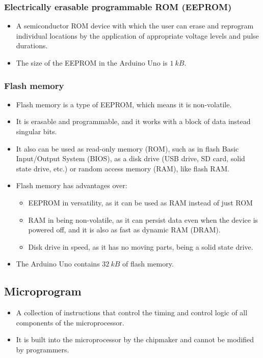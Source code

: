 \documentclass[11pt]{article}
\begin{document}
\subsubsection{Electrically erasable programmable ROM (EEPROM)}
\label{sec:org95e51de}
\begin{itemize}
\item A semiconductor ROM device with which the user can erase and reprogram individual locations by the application of appropriate voltage levels and pulse durations.
\item The size of the EEPROM in the Arduino Uno is \(\qty{1}{kB}\).
\end{itemize}

 \newpage

\subsubsection{Flash memory}
\label{sec:orgfafd8ae}
\begin{itemize}
\item Flash memory is a type of EEPROM, which means it is non-volatile.
\item It is erasable and programmable, and it works with a block of data instead singular bits.
\item It also can be used as read-only memory (ROM), such as in flash Basic Input/Output System (BIOS), as a disk drive (USB drive, SD card, solid state drive, etc.) or random access memory (RAM), like flash RAM.
\item Flash memory has advantages over:
\begin{itemize}
\item EEPROM in versatility, as it can be used as RAM instead of just ROM
\item RAM in being non-volatile, as it can persist data even when the device is powered off, and it is also as fast as dynamic RAM (DRAM).
\item Disk drive in speed, as it has no moving parts, being a solid state drive.
\end{itemize}
\item The Arduino Uno contains \(\qty{32}{kB}\) of flash memory.
\end{itemize}

\subsection{Microprogram}
\label{sec:org5bae258}
\begin{itemize}
\item A collection of instructions that control the timing and control logic of all components of the microprocessor.
\item It is built into the microprocessor by the chipmaker and cannot be modified by programmers.
\end{itemize}
\end{document}
